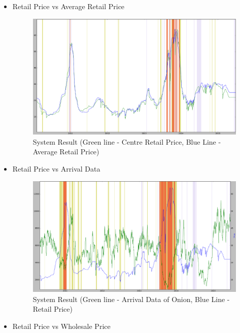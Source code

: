 \documentclass[a4paper,10pt]{article}
\begin{document}
\begin{itemize}
 \item Retail Price vs Average Retail Price
			
			\begin{figure}[H]
		    	\centering
  		    	\includegraphics[width=1.1\textwidth]{graphs/RvsAvg_Whole.png}
		    	\caption{System Result (Green line - Centre Retail Price, Blue Line - Average Retail Price)}
		    	\label{fig:RvsR}
			\end{figure}
			
	
 \item Retail Price vs Arrival Data
			
			\begin{figure}[H]
		    	\centering
  		    	\includegraphics[width=1.1\textwidth]{graphs/RetailVsArrival_whole.png}
		    	\caption{System Result (Green line - Arrival Data of Onion, Blue Line - Retail Price)}
		    	\label{fig:RvsA}
			\end{figure}
			
	
 \item Retail Price vs Wholesale Price
			

\end{itemize}
\end{document}
